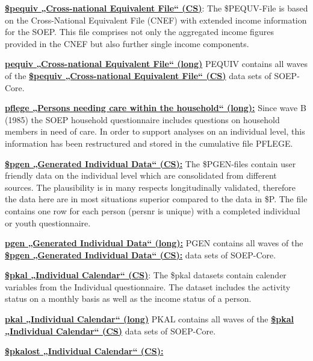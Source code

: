 \documentclass[letterpaper,10pt,openany,onesideH,english]{sphinxmanual}
\begin{document}
 \href{https://paneldata.org/soep-core/data/bgpequiv}{\textbf{\$pequiv „Cross-national Equivalent File“ (CS)}}: The \$PEQUV-File is based on the Cross-National Equivalent File (CNEF) with extended income information for the SOEP. This file comprises not only the aggregated income figures provided in the CNEF but also further single income components.

 \href{https://paneldata.org/soep-long/data/pequiv}{\textbf{pequiv „Cross-national Equivalent File“ (long)}} PEQUIV contains all waves of the  \href{https://paneldata.org/soep-core/data/bgpequiv}{\textbf{\$pequiv „Cross-national Equivalent File“ (CS)}} data sets of SOEP-Core.

 \href{https://paneldata.org/soep-core/data/pflege}{\textbf{pflege „Persons needing care within the household“ (long):}} Since wave B (1985) the SOEP household questionnaire includes questions on household members in need of care. In order to support analyses on an individual level, this information has been restructured and stored in the cumulative file PFLEGE.

 \href{https://paneldata.org/soep-core/data/bgpgen}{\textbf{\$pgen „Generated Individual Data“ (CS):}} The \$PGEN-files contain user friendly data on the individual level which are consolidated from different sources. The plausibility is in many respects longitudinally validated, therefore the data here are in most situations superior compared to the data in \$P. The file contains one row for each person (persnr is unique) with a completed individual or youth questionnaire.

 \href{https://paneldata.org/soep-long/data/pgen}{\textbf{pgen „Generated Individual Data“ (long):}} PGEN contains all waves of the  \href{https://paneldata.org/soep-core/data/bgpgen}{\textbf{\$pgen „Generated Individual Data“ (CS):}} data sets of SOEP-Core.

 \href{https://paneldata.org/soep-core/data/bgpkal}{\textbf{\$pkal „Individual Calendar“ (CS)}}: The \$pkal datasets contain calender variables from the Individual questionnaire.  The dataset includes the activity status on a monthly basis as well as the income status of a person.

 \href{https://paneldata.org/soep-long/data/pkal}{\textbf{pkal „Individual Calendar“ (long)}} PKAL contains all waves of the  \href{https://paneldata.org/soep-core/data/bgpkal}{\textbf{\$pkal „Individual Calendar“ (CS)}} data sets of SOEP-Core.

 \href{https://paneldata.org/soep-core/data/hpkalost}{\textbf{\$pkalost „Individual Calendar“ (CS):}}
\end{document}
